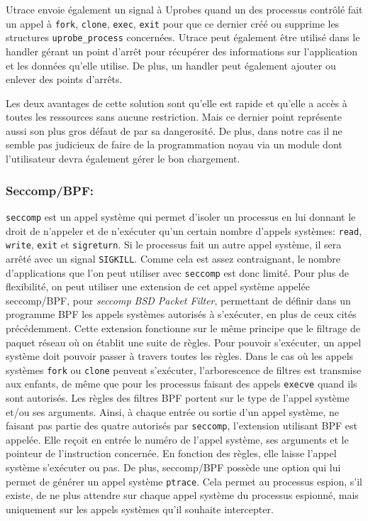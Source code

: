Utrace envoie également un signal à Uprobes quand un des processus contrôlé fait
un appel à \texttt{fork}, \texttt{clone}, \texttt{exec}, \texttt{exit} pour que
ce dernier créé ou supprime les structures \texttt{uprobe\_process}
concernées. Utrace peut également être utilisé dans le handler gérant un point
d'arrêt pour récupérer des informations sur l'application et les données qu'elle
utilise. De plus, un handler peut également ajouter ou enlever des points
d'arrêts.

Les deux avantages de cette solution sont qu'elle est rapide et qu'elle a accès
à toutes les ressources sans aucune restriction. Mais ce dernier point
représente aussi son plus gros défaut de par sa dangerosité. De plus, dans notre
cas il ne semble pas judicieux de faire de la programmation noyau via un module
dont l'utilisateur devra également gérer le bon chargement.

\subsubsection{Seccomp/BPF:}
\label{paragraph:seccomp/bpf}

\texttt{seccomp} \citep{seccompbpf} est un appel système qui permet d'isoler un processus
en lui donnant le droit de n'appeler et de n'exécuter qu'un certain nombre d'appels
systèmes: \texttt{read}, \texttt{write}, \texttt{exit} et \texttt{sigreturn}. Si
le processus fait un autre appel système, il sera arrêté avec un signal
\texttt{SIGKILL}. Comme cela est assez contraignant, le nombre d'applications
que l'on peut utiliser avec \texttt{seccomp} est donc limité. Pour plus de
flexibilité, on peut utiliser une extension de cet appel système appelée
seccomp/BPF, pour \textit{seccomp BSD Packet Filter}, permettant de définir dans
un programme BPF \citep{BPF_mccanne1993bsd} les appels systèmes autorisés à
s'exécuter, en plus de ceux cités précédemment. Cette extension fonctionne sur le
même principe que le filtrage de paquet réseau où on établit une suite de
règles. Pour pouvoir s'exécuter, un appel système doit pouvoir passer à travers
toutes les règles. Dans le cas où les appels systèmes \texttt{fork} ou
\texttt{clone} peuvent s'exécuter, l'arborescence de filtres est transmise aux
enfants, de même que pour les processus faisant des appels \texttt{execve}
quand ils sont autorisés. Les règles des filtres BPF portent sur le type de
l'appel système et/ou ses arguments. Ainsi, à chaque entrée ou sortie d'un appel
système, ne faisant pas partie des quatre autorisés par \texttt{seccomp}, l'extension
utilisant BPF est appelée. Elle reçoit en entrée le numéro de l'appel système,
ses arguments et le pointeur de l'instruction concernée. En fonction des règles,
elle laisse l'appel système s'exécuter ou pas.  De plus, seccomp/BPF possède une
option qui lui permet de générer un appel système \texttt{ptrace}. Cela permet
au processus espion, s'il existe, de ne plus attendre sur chaque appel système
du processus espionné, mais uniquement sur les appels systèmes qu'il souhaite
intercepter.

